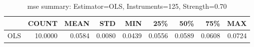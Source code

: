 \begin{table}[ht]
\centering
\caption{mse summary: Estimator=OLS, Instruments=125, Strength=0.70}
\begin{tabular}{lrrrrrrrr}
\toprule
 & COUNT & MEAN & STD & MIN & 25\% & 50\% & 75\% & MAX \\
\midrule
OLS & 10.0000 & 0.0584 & 0.0080 & 0.0439 & 0.0556 & 0.0589 & 0.0608 & 0.0724 \\
\bottomrule
\end{tabular}
\end{table}
